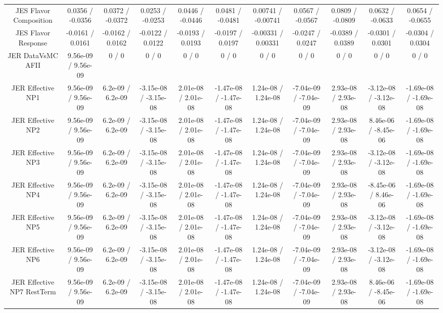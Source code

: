\begin{table}[htbp]
\begin{center}
\begin{tabular}{|c|c|c|c|c|c|c|c|c|c|c|}
  JES Flavor Composition & 0.0356 / -0.0356 & 0.0372 / -0.0372 & 0.0253 / -0.0253 & 0.0446 / -0.0446 & 0.0481 / -0.0481 & 0.00741 / -0.00741 & 0.0567 / -0.0567 & 0.0809 / -0.0809 & 0.0632 / -0.0633 & 0.0654 / -0.0655 \\ 
  JES Flavor Response & -0.0161 / 0.0161 & -0.0162 / 0.0162 & -0.0122 / 0.0122 & -0.0193 / 0.0193 & -0.0197 / 0.0197 & -0.00331 / 0.00331 & -0.0247 / 0.0247 & -0.0389 / 0.0389 & -0.0301 / 0.0301 & -0.0304 / 0.0304 \\ 
  JER DataVsMC AFII & 9.56e-09 / 9.56e-09 & 0 / 0 & 0 / 0 & 0 / 0 & 0 / 0 & 0 / 0 & 0 / 0 & 0 / 0 & 0 / 0 & 0 / 0 \\ 
  JER Effective NP1 & 9.56e-09 / 9.56e-09 & 6.2e-09 / 6.2e-09 & -3.15e-08 / -3.15e-08 & 2.01e-08 / 2.01e-08 & -1.47e-08 / -1.47e-08 & 1.24e-08 / 1.24e-08 & -7.04e-09 / -7.04e-09 & 2.93e-08 / 2.93e-08 & -3.12e-08 / -3.12e-08 & -1.69e-08 / -1.69e-08 \\ 
  JER Effective NP2 & 9.56e-09 / 9.56e-09 & 6.2e-09 / 6.2e-09 & -3.15e-08 / -3.15e-08 & 2.01e-08 / 2.01e-08 & -1.47e-08 / -1.47e-08 & 1.24e-08 / 1.24e-08 & -7.04e-09 / -7.04e-09 & 2.93e-08 / 2.93e-08 & 8.46e-06 / -8.45e-06 & -1.69e-08 / -1.69e-08 \\ 
  JER Effective NP3 & 9.56e-09 / 9.56e-09 & 6.2e-09 / 6.2e-09 & -3.15e-08 / -3.15e-08 & 2.01e-08 / 2.01e-08 & -1.47e-08 / -1.47e-08 & 1.24e-08 / 1.24e-08 & -7.04e-09 / -7.04e-09 & 2.93e-08 / 2.93e-08 & -3.12e-08 / -3.12e-08 & -1.69e-08 / -1.69e-08 \\ 
  JER Effective NP4 & 9.56e-09 / 9.56e-09 & 6.2e-09 / 6.2e-09 & -3.15e-08 / -3.15e-08 & 2.01e-08 / 2.01e-08 & -1.47e-08 / -1.47e-08 & 1.24e-08 / 1.24e-08 & -7.04e-09 / -7.04e-09 & 2.93e-08 / 2.93e-08 & -8.45e-06 / 8.46e-06 & -1.69e-08 / -1.69e-08 \\ 
  JER Effective NP5 & 9.56e-09 / 9.56e-09 & 6.2e-09 / 6.2e-09 & -3.15e-08 / -3.15e-08 & 2.01e-08 / 2.01e-08 & -1.47e-08 / -1.47e-08 & 1.24e-08 / 1.24e-08 & -7.04e-09 / -7.04e-09 & 2.93e-08 / 2.93e-08 & -3.12e-08 / -3.12e-08 & -1.69e-08 / -1.69e-08 \\ 
  JER Effective NP6 & 9.56e-09 / 9.56e-09 & 6.2e-09 / 6.2e-09 & -3.15e-08 / -3.15e-08 & 2.01e-08 / 2.01e-08 & -1.47e-08 / -1.47e-08 & 1.24e-08 / 1.24e-08 & -7.04e-09 / -7.04e-09 & 2.93e-08 / 2.93e-08 & -3.12e-08 / -3.12e-08 & -1.69e-08 / -1.69e-08 \\ 
  JER Effective NP7 RestTerm & 9.56e-09 / 9.56e-09 & 6.2e-09 / 6.2e-09 & -3.15e-08 / -3.15e-08 & 2.01e-08 / 2.01e-08 & -1.47e-08 / -1.47e-08 & 1.24e-08 / 1.24e-08 & -7.04e-09 / -7.04e-09 & 2.93e-08 / 2.93e-08 & 8.46e-06 / -8.45e-06 & -1.69e-08 / -1.69e-08 \\ 

\end{tabular}
\end{center}
\end{table}
